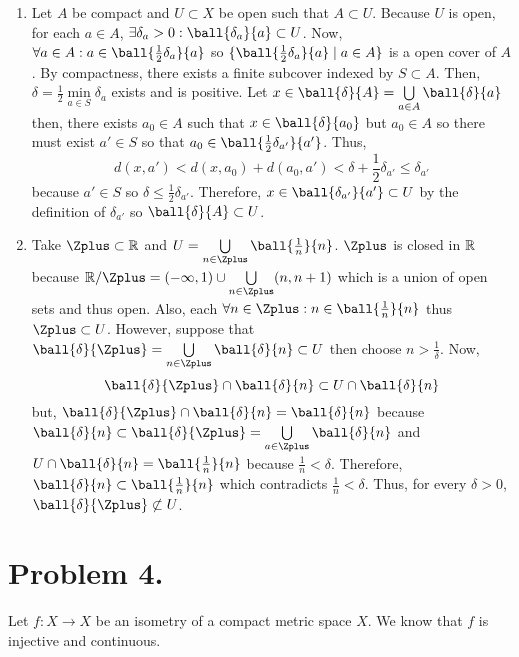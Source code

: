 \documentclass[12pt]{extarticle}
\begin{document}
\begin{enumerate}
\item Let $A$ be compact and $U \subset X$ be open such that $A \subset U$. Because $U$ is open, for each $a \in A$, $\exists \delta_a > 0 : \ball{\delta_a}{a} \subset U$. Now, $\forall a \in A : a \in \ball{\frac{1}{2}\delta_a}{a}$ so $\{\ball{\frac{1}{2}\delta_a}{a} \mid a \in A\}$ is a open cover of $A$. By compactness, there exists a finite subcover indexed by $S \subset A$. Then, $\delta = \frac{1}{2} \min\limits_{a \in S} \delta_a$ exists and is positive. Let $x \in \ball{\delta}{A} = \bigcup\limits_{a \in A} \ball{\delta}{a}$ then, there exists $a_0 \in A$ such that $x \in \ball{\delta}{a_0}$ but $a_0 \in A$ so there must exist $a' \in S$ so that $a_0 \in \ball{\frac{1}{2}\delta_{a'}}{a'}$. Thus, 
\[d(x, a') < d(x, a_0) + d(a_0, a') < \delta + \frac{1}{2} \delta_{a'} \le \delta_{a'}\] because $a' \in S$ so $\delta \le \frac{1}{2} \delta_{a'}$. Therefore, $x \in \ball{\delta_{a'}}{a'} \subset U$ by the definition of $\delta_{a'}$ so $\ball{\delta}{A} \subset U$.       

\item Take $\Zplus \subset \R$ and $U = \bigcup\limits_{n \in \Zplus} \ball{\frac{1}{n}}{n}$. $\Zplus$ is closed in $\mathbb{R}$ because $\R / \Zplus = (-\infty, 1) \cup \bigcup\limits_{n \in \Zplus} (n, n + 1)$ which is a union of open sets and thus open. Also, each $\forall n \in \Zplus : n \in \ball{\frac{1}{n}}{n}$ thus $\Zplus \subset U$. However, suppose that $\ball{\delta}{\Zplus} = \bigcup\limits_{n \in \Zplus} \ball{\delta}{n} \subset U$ then choose $n > \frac{1}{\delta}$. Now, 
\[\ball{\delta}{\Zplus} \cap \ball{\delta}{n} \subset U \cap \ball{\delta}{n}\]
but, $\ball{\delta}{\Zplus} \cap \ball{\delta}{n} = \ball{\delta}{n}$ because $\ball{\delta}{n} \subset \ball{\delta}{\Zplus} = \bigcup\limits_{a \in \Zplus} \ball{\delta}{n}$ and $U \cap \ball{\delta}{n} = \ball{\frac{1}{n}}{n}$ because $\frac{1}{n} < \delta$. Therefore, $\ball{\delta}{n} \subset \ball{\frac{1}{n}}{n}$ which contradicts $\frac{1}{n} < \delta$. Thus, for every $\delta > 0$, $\ball{\delta}{\Zplus} \not\subset U$.     

\end{enumerate}

\section*{Problem 4.}

Let $f : X \to X$ be an isometry of a compact metric space $X$. We know that $f$ is injective and continuous. 
\end{document}
